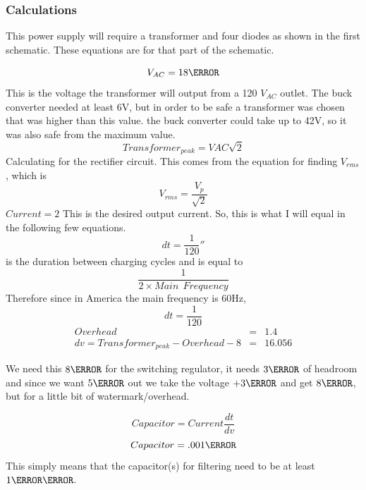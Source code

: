 \subsubsection{Calculations}
This power supply will require a transformer and four diodes as shown in the first schematic. These equations are for that part of the schematic.

\begin{equation}
V_{AC}=18 \volt
\end{equation}
 This is the voltage the transformer will output from a 120 $V_{AC}$ outlet. The buck converter needed at least 6V, but in order to be safe a transformer was chosen that was higher than this value. the buck converter could take up to 42V, so it was also safe from the maximum value.
\begin{equation}
Transformer_{peak}=VAC\sqrt{2}
\end{equation}
 Calculating for the rectifier circuit. This comes from the equation for finding $V_{rms}$, which is 
\begin{equation}
V_{rms}=\frac{V_p}{\sqrt{2}}
\end{equation}
$Current=2$ This is the desired output current. So, this is what I will equal in the following few equations.
\begin{equation}
dt=\frac{1}{120}\second
\end{equation} 
is the duration between charging cycles and is equal to 
\begin{equation}
\frac{1}{2\times Main \ \ Frequency}
\end{equation}
 Therefore since in America the main frequency is 60Hz, 
\begin{equation}
dt=\frac{1}{120}
\end{equation}
\begin{eqnarray}
Overhead&=&1.4\\
dv=Transformer_{peak}-Overhead-8&=&16.056
\end{eqnarray}

We need this $8\volt$ for the switching regulator, it needs $3\volt$ of headroom and since we want $5\volt$ out we take the voltage $+3\volt$ and get $8\volt$, but for a little bit of watermark/overhead.

\begin{equation}
Capacitor=Current\frac{dt}{dv}
\end{equation}
\begin{equation}
Capacitor=.001\farad
\end{equation}
 This simply means that the capacitor(s) for filtering need to be at least $1\milli\farad$.

